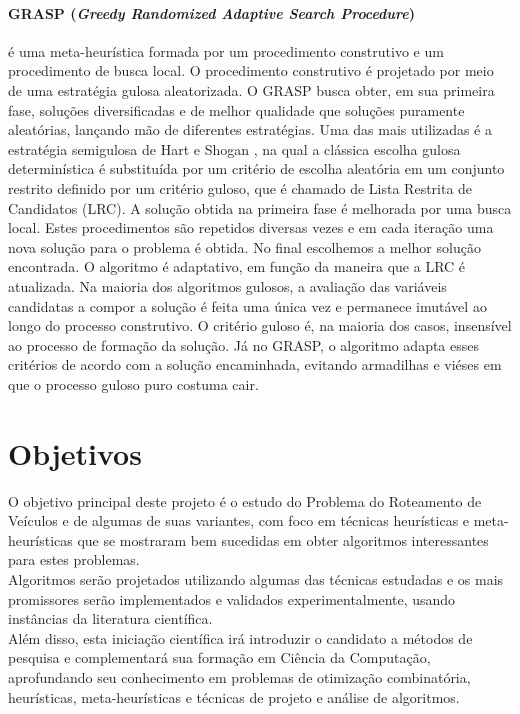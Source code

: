 \documentclass[12pt,a4paper]{article}
\newcommand{\blue}[1]{\textcolor{blue}{#1}}
\begin{document}
{\paragraph{GRASP (\textit{Greedy Randomized Adaptive Search Procedure})}é uma meta-heurística formada por um procedimento construtivo e um procedimento de busca local. O procedimento construtivo é projetado por meio de uma estratégia gulosa aleatorizada. O GRASP busca obter, em sua primeira fase, soluções diversificadas e de melhor qualidade que soluções puramente aleatórias, lançando mão de diferentes estratégias. Uma das mais utilizadas é a estratégia semigulosa de Hart e Shogan \cite{hart1987semi}, na qual a clássica escolha gulosa determinística é substituída por um critério de escolha aleatória em um conjunto restrito definido por um critério guloso, que é chamado de Lista Restrita de Candidatos (LRC). A solução obtida na primeira fase é melhorada por uma busca local. Estes procedimentos são repetidos diversas vezes e em cada iteração  uma nova solução para o problema é obtida. No final escolhemos a melhor solução encontrada. O algoritmo é adaptativo, em função da maneira que a  LRC é atualizada. Na maioria dos algoritmos gulosos, a avaliação das variáveis candidatas a compor a solução é feita uma única vez e permanece imutável ao longo do processo construtivo. O critério guloso é, na maioria dos casos, insensível ao processo de formação da solução. Já no GRASP, o algoritmo adapta esses critérios de acordo com a solução encaminhada, evitando armadilhas e viéses em que o processo guloso puro costuma cair.


\section{Objetivos}

O objetivo principal deste projeto é o estudo do Problema do Roteamento de Veículos e de algumas de suas variantes, com foco em técnicas heurísticas e meta-heurísticas que se mostraram bem sucedidas em obter algoritmos interessantes para estes problemas.\\
Algoritmos serão projetados utilizando algumas das técnicas estudadas e os mais promissores serão implementados e validados experimentalmente, usando instâncias da literatura científica.\\
Além disso, esta iniciação científica irá introduzir o candidato a métodos de pesquisa e complementará sua formação em Ciência da Computação, aprofundando seu conhecimento em problemas de otimização combinatória, heurísticas, meta-heurísticas e técnicas de projeto e análise de algoritmos.



}
\end{document}
